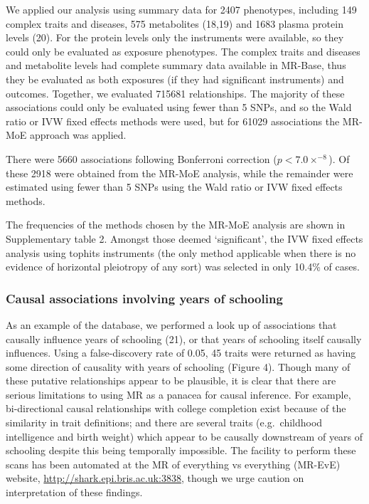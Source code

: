 \documentclass[]{article}
\begin{document}
We applied our analysis using summary data for 2407 phenotypes,
including 149 complex traits and diseases, 575 metabolites (18,19) and
1683 plasma protein levels (20). For the protein levels only the
instruments were available, so they could only be evaluated as exposure
phenotypes. The complex traits and diseases and metabolite levels had
complete summary data available in MR-Base, thus they be evaluated as
both exposures (if they had significant instruments) and outcomes.
Together, we evaluated 715681 relationships. The majority of these
associations could only be evaluated using fewer than 5 SNPs, and so the
Wald ratio or IVW fixed effects methods were used, but for 61029
associations the MR-MoE approach was applied.

There were 5660 associations following Bonferroni correction
(\(p < 7.0\times^{-8}\)). Of these 2918 were obtained from the MR-MoE
analysis, while the remainder were estimated using fewer than 5 SNPs
using the Wald ratio or IVW fixed effects methods.

The frequencies of the methods chosen by the MR-MoE analysis are shown
in Supplementary table 2. Amongst those deemed `significant', the IVW
fixed effects analysis using tophits instruments (the only method
applicable when there is no evidence of horizontal pleiotropy of any
sort) was selected in only 10.4\% of cases.

\subsubsection{Causal associations involving years of
schooling}\label{causal-associations-involving-years-of-schooling}

As an example of the database, we performed a look up of associations
that causally influence years of schooling (21), or that years of
schooling itself causally influences. Using a false-discovery rate of
0.05, 45 traits were returned as having some direction of causality with
years of schooling (Figure 4). Though many of these putative
relationships appear to be plausible, it is clear that there are serious
limitations to using MR as a panacea for causal inference. For example,
bi-directional causal relationships with college completion exist
because of the similarity in trait definitions; and there are several
traits (e.g.~childhood intelligence and birth weight) which appear to be
causally downstream of years of schooling despite this being temporally
impossible. The facility to perform these scans has been automated at
the MR of everything vs everything (MR-EvE) website,
\url{http://shark.epi.bris.ac.uk:3838}, though we urge caution on
interpretation of these findings.
\end{document}
